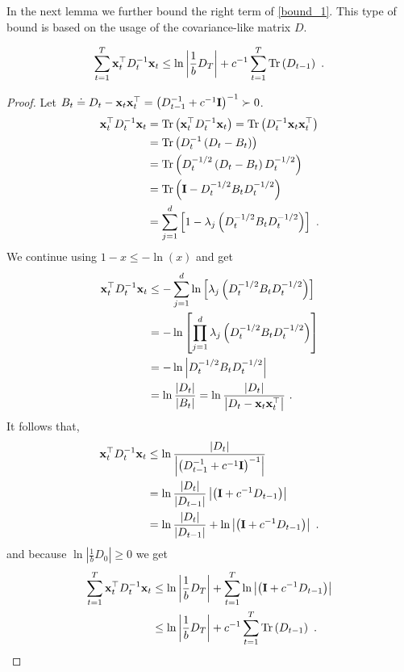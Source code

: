 In the next lemma we further bound the right term of
\eqref{bound_1}. %
This type of bound is based on the
usage of the covariance-like matrix $D$.
\begin{lemma}
\label{lem:bound_1}
\begin{equation}
\sum_{t=1}^{T}{\mathbf{x}}^{\top}_{t}D_{t}^{-1}\mathbf{x}_{t}\leq\ln\left|\frac{1}{b}D_{T}\right|
+c^{-1}\sum_{t=1}^{T} {\rm Tr}\left({D_{t-1}}\right) ~.\label{covariance_bound}
\end{equation}
\end{lemma}
\begin{proof}
Let $B_{t}\doteq D_{t}-\mathbf{x}_{t}{\mathbf{x}}^{\top}_{t}=\left(D_{t-1}^{-1}+c^{-1}\mathbf{I}\right)^{-1}\succ0$.
\begin{align*}
{\mathbf{x}}^{\top}_{t}D_{t}^{-1}\mathbf{x}_{t} & =  {\rm Tr}\left({\mathbf{x}}^{\top}_{t}D_{t}^{-1}\mathbf{x}_{t}\right)={\rm Tr}\left(D_{t}^{-1}\mathbf{x}_{t}{\mathbf{x}}^{\top}_{t}\right)\\
 & = {\rm Tr}\left(D_{t}^{-1}\left(D_{t}-B_{t}\right)\right)\\
 & = {\rm Tr}\left(D_{t}^{-1/2}\left(D_{t}-B_{t}\right)D_{t}^{-1/2}\right)\\
 & = {\rm Tr}\left(\mathbf{I}-D_{t}^{-1/2}B_{t}D_{t}^{-1/2}\right)\\
 & =
 \sum_{j=1}^{d}\left[1-\lambda_{j}\left(D_{t}^{-1/2}B_{t}D_{t}^{-1/2}\right)\right] ~.
\end{align*}
We continue using $1-x\leq-\ln\left(x\right)$ and get
\begin{align*}
{\mathbf{x}}^{\top}_{t}D_{t}^{-1}\mathbf{x}_{t} & \leq  -\sum_{j=1}^{d}\ln\left[\lambda_{j}\left(D_{t}^{-1/2}B_{t}D_{t}^{-1/2}\right)\right]\\
 & = -\ln\left[\prod_{j=1}^{d}\lambda_{j}\left(D_{t}^{-1/2}B_{t}D_{t}^{-1/2}\right)\right]\\
 & = -\ln\left|D_{t}^{-1/2}B_{t}D_{t}^{-1/2}\right|\\
 & =
 \ln\frac{\left|D_{t}\right|}{\left|B_{t}\right|}=\ln\frac{\left|D_{t}\right|}{\left|D_{t}-\mathbf{x}_{t}{\mathbf{x}}^{\top}_{t}\right|} ~.
\end{align*}
It follows that,
\begin{align*}
{\mathbf{x}}^{\top}_{t}D_{t}^{-1}\mathbf{x}_{t}
& \leq
\ln\frac{\left|D_{t}\right|}{\left|\left(D_{t-1}^{-1}+c^{-1}\mathbf{I}\right)^{-1}\right|}\\
 & =  \ln\frac{\left|D_{t}\right|}{\left|D_{t-1}\right|}\left|\left(\mathbf{I}+c^{-1}D_{t-1}\right)\right|\\
 & =
\ln\frac{\left|D_{t}\right|}{\left|D_{t-1}\right|}+\ln\left|\left(\mathbf{I}+c^{-1}D_{t-1}\right)\right| ~.
\end{align*}
 and because $\ln\left|\frac{1}{b}D_{0}\right| \geq 0$ we get
\begin{align*}
\sum_{t=1}^{T}{\mathbf{x}}^{\top}_{t}D_{t}^{-1}\mathbf{x}_{t}&\leq
\ln\left|\frac{1}{b}D_{T}\right|
+\sum_{t=1}^{T}\ln\left|\left(\mathbf{I}+c^{-1}D_{t-1}\right)\right|\\
& \leq \ln\left|\frac{1}{b}D_{T}\right|
 +c^{-1}\sum_{t=1}^{T} {\rm Tr}\left({D_{t-1}}\right) ~.
\end{align*}
\QED
\end{proof}

